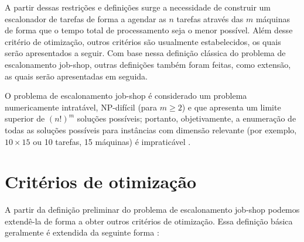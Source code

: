 \documentclass[relatorio,nocolorlinks]{inf-ufg}
\begin{document}
A partir dessas restri\c{c}\~{o}es e defini\c{c}\~{o}es surge a necessidade de construir um escalonador de tarefas de forma a agendar as $n$
tarefas atrav\'{e}s das $m$ m\'{a}quinas de forma que o tempo total de processamento seja o menor poss\'{i}vel. Al\'{e}m desse crit\'{e}rio de
otimiza\c{c}\~{a}o, outros crit\'{e}rios s\~{a}o usualmente estabelecidos, os quais ser\~{a}o apresentados a seguir. Com base nessa
defini\c{c}\~{a}o cl\'{a}ssica do problema de escalonamento job-shop, outras defini\c{c}\~{o}es tamb\'{e}m foram feitas, como extens\~{a}o, as
quais ser\~{a}o apresentadas em seguida.

O problema de escalonamento job-shop \'{e} considerado um problema numericamente intrat\'{a}vel, NP-dif\'{i}cil (para $m \geq 2$) \cite{French1982}
e que apresenta um limite superior de $(n!)^{m}$ solu\c{c}\~{o}es poss\'{i}veis; portanto, objetivamente, a enumera\c{c}\~{a}o de todas as
solu\c{c}\~{o}es poss\'{i}veis para inst\^{a}ncias com dimens\~{a}o relevante (por exemplo, $10 \times 15$ ou 10 tarefas, 15 m\'{a}quinas) \'{e}
impratic\'{a}vel \cite{Rondon2009}.

\section{Crit\'{e}rios de otimiza\c{c}\~{a}o}

A partir da defini\c{c}\~{a}o preliminar do problema de escalonamento job-shop podemos extend\^{e}-la de forma a obter outros crit\'{e}rios de
otimiza\c{c}\~{a}o. Essa defini\c{c}\~{a}o b\'{a}sica geralmente \'{e} extendida da seguinte forma \cite{French1982} \cite{Rondon2009}:
\end{document}
